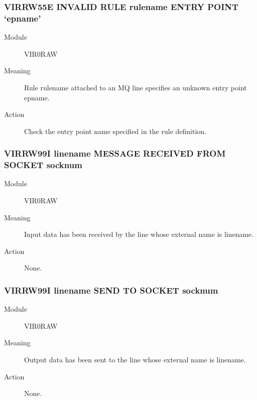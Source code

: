 \documentclass[letterpaper,10pt,english]{sphinxmanual}
\begin{document}
\subsubsection{VIRRW55E INVALID RULE rulename ENTRY POINT ‘epname’}
\label{\detokenize{messages:virrw55e-invalid-rule-rulename-entry-point-epname}}\begin{description}
\item[{Module}] \leavevmode
VIR0RAW

\item[{Meaning}] \leavevmode
Rule rulename attached to an MQ line specifies an unknown entry point epname.

\item[{Action}] \leavevmode
Check the entry point name specified in the rule definition.

\end{description}


\subsubsection{VIRRW99I linename MESSAGE RECEIVED FROM SOCKET socknum}
\label{\detokenize{messages:virrw99i-linename-message-received-from-socket-socknum}}\begin{description}
\item[{Module}] \leavevmode
VIR0RAW

\item[{Meaning}] \leavevmode
Input data has been received by the line whose external name is linename.

\item[{Action}] \leavevmode
None.

\end{description}


\subsubsection{VIRRW99I linename SEND TO SOCKET socknum}
\label{\detokenize{messages:virrw99i-linename-send-to-socket-socknum}}\begin{description}
\item[{Module}] \leavevmode
VIR0RAW

\item[{Meaning}] \leavevmode
Output data has been sent to the line whose external name is linename.

\item[{Action}] \leavevmode
None.

\end{description}
\end{document}
